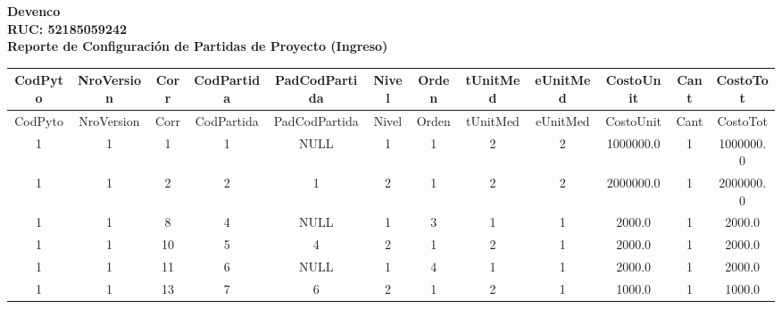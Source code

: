 \documentclass[a4paper, landscape]{article}
\begin{document}
\begin{center}
\vspace{0.5cm}
\textbf{\Huge Devenco}\\ %
\vspace{0.2cm}
\textbf{\Large RUC: 52185059242}\\ %
\vspace{1cm}
\textbf{\Large Reporte de Configuración de Partidas de Proyecto (Ingreso)}
\end{center}
\vspace{1cm}
\begin{center}
\begin{longtable}{|c|c|c|c|c|c|c|c|c|c|c|c|}
\hline
CodPyto & NroVersion & Corr & CodPartida & PadCodPartida & Nivel & Orden & tUnitMed & eUnitMed & CostoUnit & Cant & CostoTot \\
\hline
\endfirsthead
\hline
CodPyto & NroVersion & Corr & CodPartida & PadCodPartida & Nivel & Orden & tUnitMed & eUnitMed & CostoUnit & Cant & CostoTot \\
\hline
\endhead
1 & 1 & 1 & 1 & NULL & 1 & 1 & 2 & 2 & 1000000.0 & 1 & 1000000.0 \\
1 & 1 & 2 & 2 & 1 & 2 & 1 & 2 & 2 & 2000000.0 & 1 & 2000000.0 \\
1 & 1 & 8 & 4 & NULL & 1 & 3 & 1 & 1 & 2000.0 & 1 & 2000.0 \\
1 & 1 & 10 & 5 & 4 & 2 & 1 & 2 & 1 & 2000.0 & 1 & 2000.0 \\
1 & 1 & 11 & 6 & NULL & 1 & 4 & 1 & 1 & 2000.0 & 1 & 2000.0 \\
1 & 1 & 13 & 7 & 6 & 2 & 1 & 2 & 1 & 1000.0 & 1 & 1000.0 \\
\hline
\end{longtable}
\end{center}
\end{document}
